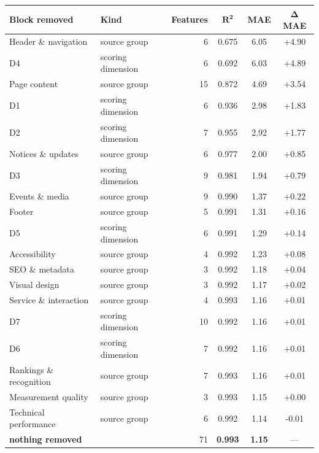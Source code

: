 \begin{tabular}{llrccc}
\toprule
\textbf{Block removed} & \textbf{Kind} & \textbf{Features} & $\boldsymbol{R^2}$ & \textbf{MAE} & $\boldsymbol{\Delta}$\textbf{MAE} \\
\midrule
Header \& navigation & \small source group & 6 & 0.675 & 6.05 & +4.90 \\
D4 & \small scoring dimension & 6 & 0.692 & 6.03 & +4.89 \\
Page content & \small source group & 15 & 0.872 & 4.69 & +3.54 \\
D1 & \small scoring dimension & 6 & 0.936 & 2.98 & +1.83 \\
D2 & \small scoring dimension & 7 & 0.955 & 2.92 & +1.77 \\
Notices \& updates & \small source group & 6 & 0.977 & 2.00 & +0.85 \\
D3 & \small scoring dimension & 9 & 0.981 & 1.94 & +0.79 \\
Events \& media & \small source group & 9 & 0.990 & 1.37 & +0.22 \\
Footer & \small source group & 5 & 0.991 & 1.31 & +0.16 \\
D5 & \small scoring dimension & 6 & 0.991 & 1.29 & +0.14 \\
Accessibility & \small source group & 4 & 0.992 & 1.23 & +0.08 \\
SEO \& metadata & \small source group & 3 & 0.992 & 1.18 & +0.04 \\
Visual design & \small source group & 3 & 0.992 & 1.17 & +0.02 \\
Service \& interaction & \small source group & 4 & 0.993 & 1.16 & +0.01 \\
D7 & \small scoring dimension & 10 & 0.992 & 1.16 & +0.01 \\
D6 & \small scoring dimension & 7 & 0.992 & 1.16 & +0.01 \\
Rankings \& recognition & \small source group & 7 & 0.993 & 1.16 & +0.01 \\
Measurement quality & \small source group & 3 & 0.993 & 1.15 & +0.00 \\
Technical performance & \small source group & 6 & 0.992 & 1.14 & -0.01 \\
\midrule
\textbf{nothing removed} & & 71 & \textbf{0.993} & \textbf{1.15} & --- \\
\bottomrule
\end{tabular}

